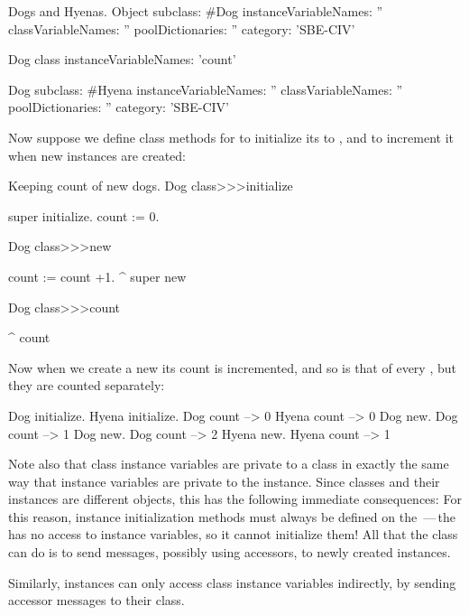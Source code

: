 \documentclass[a4paper,10pt,twoside]{book}
\begin{document}
\begin{classdef}[dog]{Dogs and Hyenas.}
Object subclass: #Dog
	instanceVariableNames: ''
	classVariableNames: ''
	poolDictionaries: ''
	category: 'SBE-CIV'

Dog class
	instanceVariableNames: 'count'

Dog subclass: #Hyena
	instanceVariableNames: ''
	classVariableNames: ''
	poolDictionaries: ''
	category: 'SBE-CIV'
\end{classdef}

Now suppose we define class methods for  to initialize its  to , and to increment it when new instances are created:
\begin{methods}[dogcount]{Keeping count of new dogs.}
Dog class>>>initialize

	super initialize.
	count := 0.


Dog class>>>new

	count := count +1.
	^ super new


Dog class>>>count

	^ count
\end{methods}

Now when we create a new  its count is incremented, and so is that of every , but they are counted separately:
\begin{code}{}
Dog initialize.
Hyena initialize.
Dog count     --> 0
Hyena count --> 0
Dog new.
Dog count     --> 1
Dog new.
Dog count     --> 2
Hyena new.
Hyena count --> 1
\end{code}

Note also that class instance variables are private to a class in exactly the same way that instance variables are private to the instance.
Since classes and their instances are different objects, this has the following immediate consequences:
For this reason, instance initialization methods must always be defined on the \,---\,the  has no access to instance variables, so it cannot initialize them!
All that the class can do is to send  messages, possibly using accessors, to newly created instances.

Similarly, instances can only access class instance variables indirectly, by sending accessor messages to their class.
\end{document}
